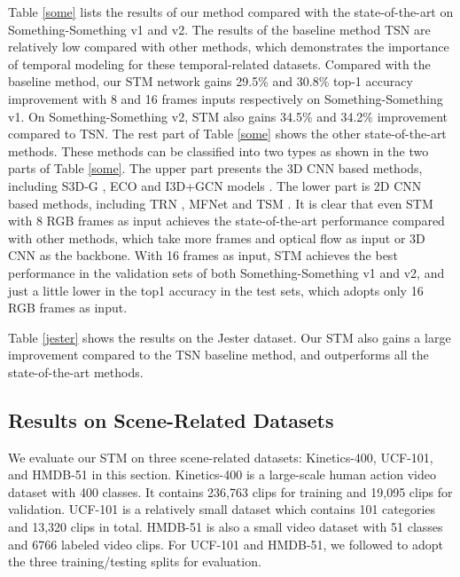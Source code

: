 \documentclass[10pt,twocolumn,letterpaper]{article}
\begin{document}
	Table \ref{some} lists the results of our method compared with the state-of-the-art on Something-Something v1 and v2. The results of the baseline method TSN are relatively low compared with other methods, which demonstrates the importance of temporal modeling for these temporal-related datasets. Compared with the baseline method, our STM network gains 29.5\% and 30.8\% top-1 accuracy improvement with 8 and 16 frames inputs respectively on Something-Something v1. On Something-Something v2, STM also gains 34.5\% and 34.2\% improvement compared to TSN. The rest part of Table \ref{some} shows the other state-of-the-art methods. These methods can be classified into two types as shown in the two parts of Table \ref{some}. The upper part presents the 3D CNN based methods, including S3D-G \cite{xie2018rethinking}, ECO \cite{zolfaghari2018eco} and I3D+GCN models \cite{wang2018videos}. The lower part is 2D CNN based methods, including TRN \cite{zhou2018temporal}, MFNet \cite{lee2018motion} and TSM \cite{lin2018temporal}. It is clear that even STM with 8 RGB frames as input achieves the state-of-the-art performance compared with other methods, which take more frames and optical flow as input or 3D CNN as the backbone. With 16 frames as input, STM achieves the best performance in the validation sets of both Something-Something v1 and v2, and just a little lower in the top1 accuracy in the test sets, which adopts only 16 RGB frames as input.

	Table \ref{jester} shows the results on the Jester dataset. Our STM also gains a large improvement compared to the TSN baseline method, and outperforms all the state-of-the-art methods.


	\subsection{Results on Scene-Related Datasets}
	We evaluate our STM on three scene-related datasets: Kinetics-400, UCF-101, and HMDB-51 in this section. Kinetics-400 is a large-scale human action video dataset with 400 classes. It contains 236,763 clips for training and 19,095 clips for validation. UCF-101 is a relatively small dataset which contains 101 categories and 13,320 clips in total. HMDB-51 is also a small video dataset with 51 classes and 6766 labeled video clips. For UCF-101 and HMDB-51, we followed \cite{wang2016temporal} to adopt the three training/testing splits for evaluation.
	
	
\end{document}
